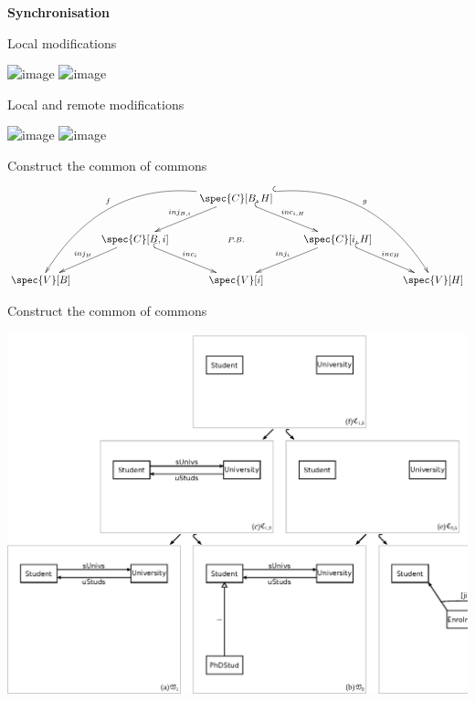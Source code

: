 \documentclass[dvips,slidetop,mathserif,brown]{beamer}
\begin{document}
\begin{frame}{}
  \begin{center}
    \begin{Huge}
      \textbf{Synchronisation}
    \end{Huge}
  \end{center}
\end{frame}

\begin{frame}{Local modifications}
  \begin{center}
    \includegraphics<1>{po_ud_d_md_1}
    \includegraphics<2>{po_ud_d_md_2}
  \end{center}
\end{frame}

\begin{frame}{Local and remote modifications}
  \begin{center}
    \includegraphics<1>{po_ud_d_md_2}
    \includegraphics<2>{po_ud_d_md_3}
  \end{center}
\end{frame}

\begin{frame}{Construct the common of commons}
  \begin{center}
    $\xymatrix{
      & & \spec{C}[B,H] \ar[dl]_-{inj_{B,i}} \ar@{^{(}->}[dr]^-{inc_{i,H}} \ar@{}[dd]|-{P.B.} \ar@/_4em/[ddll]_-{f} \ar@/^4em/@{^{(}->}[ddrr]^-{g} \\
      & \spec{C}[B,i] \ar[dl]_-{inj_B} \ar@{^{(}->}[dr]^-{inc_i} & & \spec{C}[i,H] \ar[dl]_-{inj_{i}} \ar@{^{(}->}[dr]^-{inc_{H}} \\
      \spec{V}[B] & & \spec{V}[i] & & \spec{V}[H]
    }$
  \end{center}
\end{frame}

\begin{frame}{Construct the common of commons}
  \begin{center}
    \includegraphics[width=\textwidth]{ex_project_vc_standard_common_commons}
  \end{center}
\end{frame}
\end{document}
